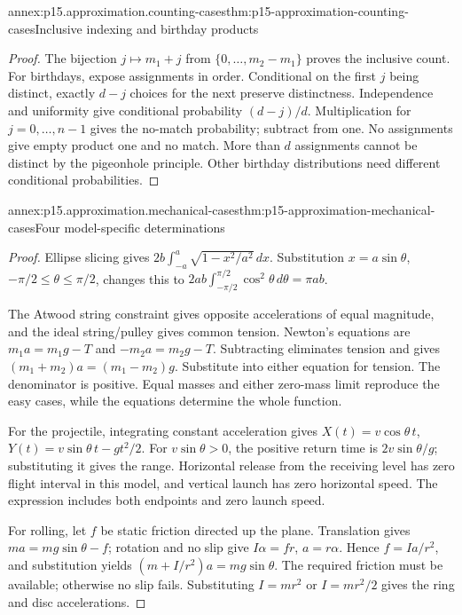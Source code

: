 \begin{annexitem}{annex:p15.approximation.counting-cases}{thm:p15-approximation-counting-cases}{Inclusive indexing and birthday products}
\begin{proof}
The bijection \(j\mapsto m_1+j\) from
\(\{0,\ldots,m_2-m_1\}\) proves the inclusive count.
For birthdays, expose assignments in order. Conditional on the first
\(j\) being distinct, exactly \(d-j\) choices for the next preserve
distinctness. Independence and uniformity give conditional probability
\((d-j)/d\). Multiplication for \(j=0,\ldots,n-1\) gives the no-match
probability; subtract from one. No assignments give empty product one
and no match. More than \(d\) assignments cannot be distinct by the
pigeonhole principle. Other birthday distributions need different
conditional probabilities.
\end{proof}
\end{annexitem}

\begin{annexitem}{annex:p15.approximation.mechanical-cases}{thm:p15-approximation-mechanical-cases}{Four model-specific determinations}
\begin{proof}
Ellipse slicing gives
\(2b\int_{-a}^a\sqrt{1-x^2/a^2}\,dx\). Substitution
\(x=a\sin\theta\), \(-\pi/2\leq\theta\leq\pi/2\), changes this to
\(2ab\int_{-\pi/2}^{\pi/2}\cos^2\theta\,d\theta=\pi ab\).

The Atwood string constraint gives opposite accelerations of equal
magnitude, and the ideal string/pulley gives common tension. Newton's
equations are \(m_1a=m_1g-T\) and \(-m_2a=m_2g-T\).
Subtracting eliminates tension and gives
\((m_1+m_2)a=(m_1-m_2)g\). Substitute into either equation for tension.
The denominator is positive. Equal masses and either zero-mass limit
reproduce the easy cases, while the equations determine the whole function.

For the projectile, integrating constant acceleration gives
\(X(t)=v\cos\theta\,t\), \(Y(t)=v\sin\theta\,t-gt^2/2\).
For \(v\sin\theta>0\), the positive return time is
\(2v\sin\theta/g\); substituting it gives the range. Horizontal
release from the receiving level has zero flight interval in this model,
and vertical launch has zero horizontal speed. The expression includes
both endpoints and zero launch speed.

For rolling, let \(f\) be static friction directed up the plane.
Translation gives \(ma=mg\sin\theta-f\); rotation and no slip give
\(I\alpha=fr\), \(a=r\alpha\). Hence \(f=Ia/r^2\), and substitution
yields \((m+I/r^2)a=mg\sin\theta\). The required friction must be
available; otherwise no slip fails. Substituting \(I=mr^2\) or
\(I=mr^2/2\) gives the ring and disc accelerations.
\end{proof}
\end{annexitem}

